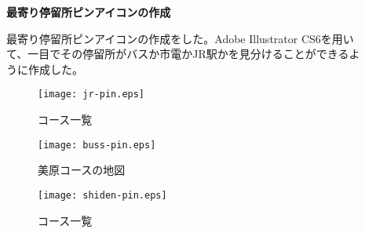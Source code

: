 ﻿\begin{description}
 \item[] \textbf{最寄り停留所ピンアイコンの作成}\par
 最寄り停留所ピンアイコンの作成をした。Adobe Illustrator CS6を用いて、一目でその停留所がバスか市電かJR駅かを見分けることができるように作成した。
  \par

\begin{figure}[htbp]
 \begin{minipage}{0.3\hsize}
  \begin{center}
   \texttt{[image: jr-pin.eps]}
  \end{center}
  \caption{コース一覧}
  \label{fig:one}
 \end{minipage}
\begin{minipage}{0.3\hsize}
  \begin{center}
   \texttt{[image: buss-pin.eps]}
  \end{center}
  \caption{美原コースの地図}
  \label{fig:two}
 \end{minipage}
\begin{minipage}{0.3\hsize}
  \begin{center}
   \texttt{[image: shiden-pin.eps]}
  \end{center}
  \caption{コース一覧}
  \label{fig:three}
 \end{minipage}
\end{figure}
\end{description}
